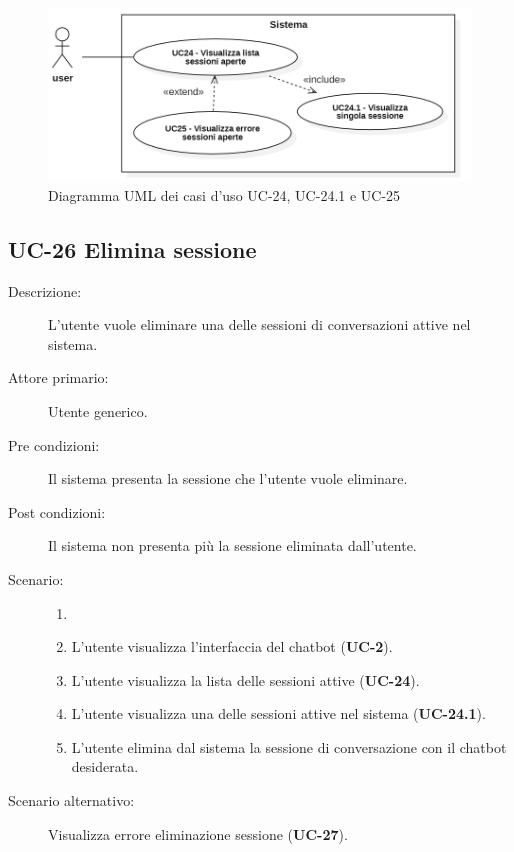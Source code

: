 \begin{figure}[H]
    \centering
    \includegraphics[width=0.8\linewidth]{UC24-25.PNG}
    \caption{Diagramma UML dei casi d'uso UC-24, UC-24.1 e UC-25}
    \label{fig:UC24-25}
\end{figure}

\subsection{UC-26 Elimina sessione}
\begin{description}
    \item[Descrizione:] L'utente vuole eliminare una delle sessioni di conversazioni attive nel sistema.
    \item[Attore primario:] Utente generico.
    \item[Pre condizioni:] Il sistema presenta la sessione che l'utente vuole eliminare.
    \item[Post condizioni:] Il sistema non presenta più la sessione eliminata dall'utente.
    \item[Scenario:] 
    \begin{enumerate}
        \item[] 
        \item L’utente visualizza l'interfaccia del chatbot (\textbf{UC-2}).
        \item L'utente visualizza la lista delle sessioni attive (\textbf{UC-24}).
        \item L'utente visualizza una delle sessioni attive nel sistema (\textbf{UC-24.1}).
        \item L'utente elimina dal sistema la sessione di conversazione con il chatbot desiderata.
    \end{enumerate}
    \item[Scenario alternativo:] Visualizza errore eliminazione sessione (\textbf{UC-27}).
\end{description}

